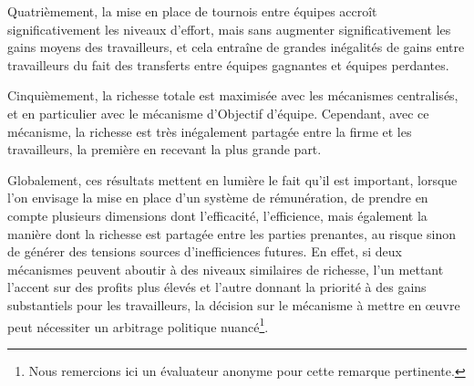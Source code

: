 \begin{Article}
\begin{refsection}[Lebourges]
Quatrièmement, la mise en place de tournois entre équipes accroît
significativement les niveaux d'effort, mais sans augmenter
significativement les gains moyens des travailleurs, et cela entraîne de
grandes inégalités de gains entre travailleurs du fait des transferts
entre équipes gagnantes et équipes perdantes.

Cinquièmement, la richesse totale est maximisée avec les mécanismes
centralisés, et en particulier avec le mécanisme d'Objectif d'équipe.
Cependant, avec ce mécanisme, la richesse est très inégalement partagée
entre la firme et les travailleurs, la première en recevant la plus
grande part.

Globalement, ces résultats mettent en lumière le fait qu'il est
important, lorsque l'on envisage la mise en place d'un système de
rémunération, de prendre en compte plusieurs dimensions dont
l'efficacité, l'efficience, mais également la manière dont la richesse
est partagée entre les parties prenantes, au risque sinon de générer des
tensions sources d'inefficiences futures. En effet, si deux mécanismes
peuvent aboutir à des niveaux similaires de richesse, l'un mettant
l'accent sur des profits plus élevés et l'autre donnant la priorité à
des gains substantiels pour les travailleurs, la décision sur le
mécanisme à mettre en œuvre peut nécessiter un arbitrage politique
nuancé\footnote{Nous remercions ici un évaluateur anonyme pour cette
  remarque pertinente.}.


\end{refsection}
\end{Article}
